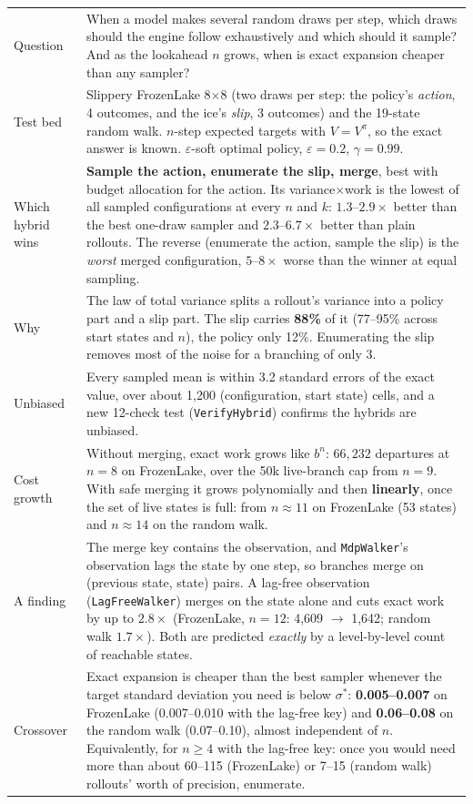 \documentclass[11pt]{article}
\renewcommand{\arraystretch}{1.25}
\newcommand{\code}[1]{\texttt{#1}}
\begin{document}
{\small
\renewcommand{\arraystretch}{1.12}
\begin{tabularx}{\linewidth}{@{}>{\bfseries\raggedright\arraybackslash}p{2.5cm}Y@{}}
\toprule
Question & When a model makes several random draws per step, which draws should the engine follow
  exhaustively and which should it sample? And as the lookahead $n$ grows, when is exact expansion cheaper than
  any sampler?\\
Test bed & Slippery FrozenLake 8$\times$8 (two draws per step: the policy's \emph{action}, 4 outcomes, and the
  ice's \emph{slip}, 3 outcomes) and the 19-state random walk. $n$-step expected targets with $V=V^\pi$, so the
  exact answer is known. $\varepsilon$-soft optimal policy, $\varepsilon=0.2$, $\gamma=0.99$.\\
Which hybrid wins & \textbf{Sample the action, enumerate the slip, merge}, best with budget allocation for the
  action. Its variance$\times$work is the lowest of all sampled configurations at every $n$ and $k$: $1.3$--$2.9\times$
  better than the best one-draw sampler and $2.3$--$6.7\times$ better than plain rollouts. The reverse (enumerate the
  action, sample the slip) is the \emph{worst} merged configuration, $5$--$8\times$ worse than the winner at equal
  sampling.\\
Why & The law of total variance splits a rollout's variance into a policy part and a slip part. The slip carries
  \textbf{88\%} of it (77--95\% across start states and $n$), the policy only 12\%. Enumerating the slip removes
  most of the noise for a branching of only 3.\\
Unbiased & Every sampled mean is within 3.2 standard errors of the exact value, over about 1{,}200 (configuration,
  start state) cells, and a new 12-check test (\code{VerifyHybrid}) confirms the hybrids are unbiased.\\
Cost growth & Without merging, exact work grows like $b^n$: $66{,}232$ departures at $n=8$ on FrozenLake, over
  the 50k live-branch cap from $n=9$. With safe merging it grows polynomially and then \textbf{linearly}, once the
  set of live states is full: from $n\approx11$ on FrozenLake (53 states) and $n\approx14$ on the random walk.\\
A finding & The merge key contains the observation, and \code{MdpWalker}'s observation lags the state by one step,
  so branches merge on (previous state, state) pairs. A lag-free observation (\code{LagFreeWalker}) merges on the
  state alone and cuts exact work by up to $2.8\times$ (FrozenLake, $n=12$: 4{,}609 $\to$ 1{,}642; random walk
  $1.7\times$). Both are predicted \emph{exactly} by a level-by-level count of reachable states.\\
Crossover & Exact expansion is cheaper than the best sampler whenever the target standard deviation you need is
  below $\sigma^*$: \textbf{0.005--0.007} on FrozenLake (0.007--0.010 with the lag-free key) and \textbf{0.06--0.08}
  on the random walk (0.07--0.10), almost independent of $n$. Equivalently, for $n\ge4$ with the lag-free key: once
  you would need more than about 60--115 (FrozenLake) or 7--15 (random walk) rollouts' worth of precision,
  enumerate.\\
\bottomrule
\end{tabularx}

}
\end{document}
